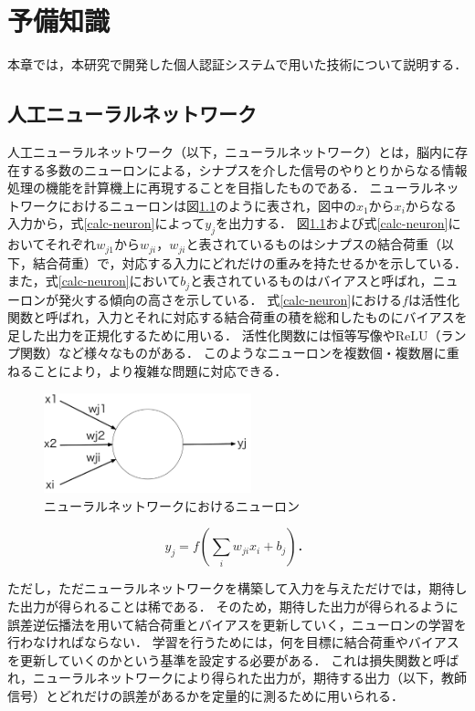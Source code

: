 \chapter{予備知識}
本章では，本研究で開発した個人認証システムで用いた技術について説明する．

\section{人工ニューラルネットワーク}
人工ニューラルネットワーク（以下，ニューラルネットワーク）とは，脳内に存在する多数のニューロンによる，シナプスを介した信号のやりとりからなる情報処理の機能を計算機上に再現することを目指したものである．
ニューラルネットワークにおけるニューロンは図\ref{neuron}のように表され，図中の$x_1$から$x_i$からなる入力から，式\ref{calc-neuron}によって$y_j$を出力する．
図\ref{neuron}および式\ref{calc-neuron}においてそれぞれ$w_{j1}$から$w_{ji}$，$w_{ji}$と表されているものはシナプスの結合荷重（以下，結合荷重）で，対応する入力にどれだけの重みを持たせるかを示している．
また，式\ref{calc-neuron}において$b_j$と表されているものはバイアスと呼ばれ，ニューロンが発火する傾向の高さを示している．
式\ref{calc-neuron}における$f$は活性化関数と呼ばれ，入力とそれに対応する結合荷重の積を総和したものにバイアスを足した出力を正規化するために用いる．
活性化関数には恒等写像やReLU（ランプ関数）など様々なものがある．
このようなニューロンを複数個・複数層に重ねることにより，より複雑な問題に対応できる．

\begin{figure}[hbtp]
  \centering
  \includegraphics[bb=0 0 683 330, width=6cm]{Figures/neuron.pdf}
  \caption{ニューラルネットワークにおけるニューロン}
  \label{neuron}
\end{figure}

\begin{equation}
\label{calc-neuron}
y_j = f(\sum_i w_{ji} x_i + b_j)．
\end{equation}

ただし，ただニューラルネットワークを構築して入力を与えただけでは，期待した出力が得られることは稀である．
そのため，期待した出力が得られるように誤差逆伝播法を用いて結合荷重とバイアスを更新していく，ニューロンの学習を行わなければならない．
学習を行うためには，何を目標に結合荷重やバイアスを更新していくのかという基準を設定する必要がある．
これは損失関数と呼ばれ，ニューラルネットワークにより得られた出力が，期待する出力（以下，教師信号）とどれだけの誤差があるかを定量的に測るために用いられる．


